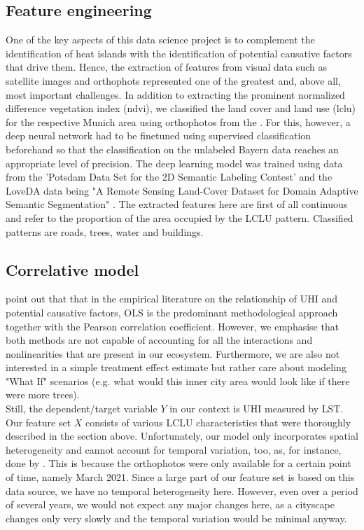 \documentclass[12pt]{article}
\begin{document}
\subsection{Feature engineering}

One of the key aspects of this data science project is to complement the identification of heat islands with the identification of potential causative factors that drive them. Hence, the extraction of features from visual data such as satellite images and orthophots represented one of the greatest and, above all, most important challenges. In addition to extracting the prominent normalized difference vegetation index (\acrshort{ndvi}), we classified the land cover and land use (\acrshort{lclu}) for the respective Munich area using orthophotos from the \citet{bayern2018}. For this, however, a deep neural network had to be finetuned using supervised classification beforehand so that the classification on the unlabeled Bayern data reaches an appropriate level of precision. The deep learning model was trained using data from the 'Potsdam Data Set for the 2D Semantic Labeling Contest'  and the LoveDA data being "A Remote Sensing Land-Cover Dataset for Domain Adaptive Semantic Segmentation" \citep{loveda2021}. The extracted features here are first of all continuous and refer to the proportion of the area occupied by the LCLU pattern. Classified patterns are roads, trees, water and buildings.

\subsection{Correlative model}

\citet{deilami2018} point out that that in the empirical literature on the relationship of UHI and potential causative factors, OLS is the predominant methodological approach together with the Pearson correlation coefficient. However, we emphasise that both methods are not capable of accounting for all the interactions and nonlinearities that are present in our ecosystem. Furthermore, we are also not interested in a simple treatment effect estimate but rather care about modeling "What If" scenarios (e.g. what would this inner city area would look like if there were more trees).\\
Still, the dependent/target variable $Y$ in our context is UHI measured by LST. Our feature set $X$ consists of various LCLU characteristics that were thoroughly described in the section above. Unfortunately, our model only incorporates spatial heterogeneity and cannot account for temporal variation, too, as, for instance, done by \citet{seebacher2019}. This is because the orthophotos were only available for a certain point of time, namely March 2021. Since a large part of our feature set is based on this data source, we have no temporal heterogeneity here. However, even over a period of several years, we would not expect any major changes here, as a cityscape changes only very slowly and the temporal variation would be minimal anyway.
\end{document}
